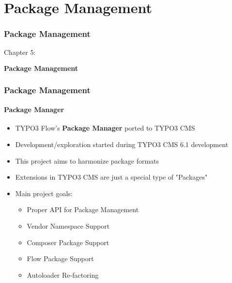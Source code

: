 %

\section{Package Management}
\begin{frame}[fragile]
	\frametitle{Package Management}

	\begin{center}\huge{Chapter 5:}\end{center}
	\begin{center}\huge{\color{typo3darkgrey}\textbf{Package Management}}\end{center}

\end{frame}


	\begin{frame}[fragile]
	\frametitle{Package Management}
	\framesubtitle{Package Manager}

	\begin{itemize}
		\item TYPO3 Flow's \textbf{Package Manager} ported to TYPO3 CMS
		\item Development/exploration started during TYPO3 CMS 6.1 development
		\item This project aims to harmonize package formats
		\item Extensions in TYPO3 CMS are just a special type of "Packages"
		\item Main project goals:

			\begin{itemize}
				\item Proper API for Package Management
				\item Vendor Namespace Support
				\item Composer Package Support
				\item Flow Package Support
				\item Autoloader Re-factoring
			\end{itemize}

	\end{itemize}

\end{frame}

